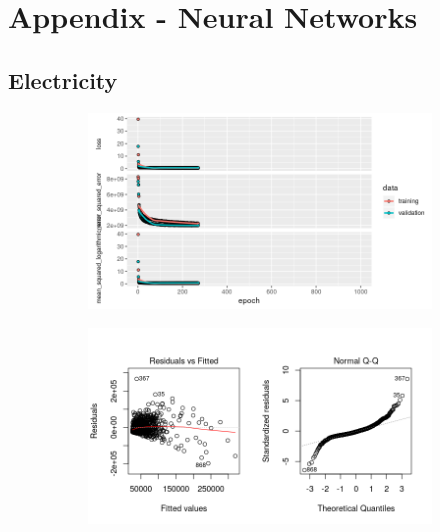 \section{Appendix - Neural Networks}
\label{sec:appendix_nn}
\appendix
\subsection{Electricity}
\label{appendix_nn:electricity:nn_full}
\begin{figure}[h]
\begin{subfigure}{1\textwidth}
\centering
\includegraphics[width=.99\textwidth, height=0.4\textheight]{Images/electricity_psf_nn_full_train_results.png}
\end{subfigure}
\begin{subfigure}{1\textwidth}
\centering
\includegraphics[width=.99\textwidth, height=0.3\textheight]{Images/electricity_psf_nn_full_resid_1.png}
\end{subfigure}
\end{figure}
\newpage

